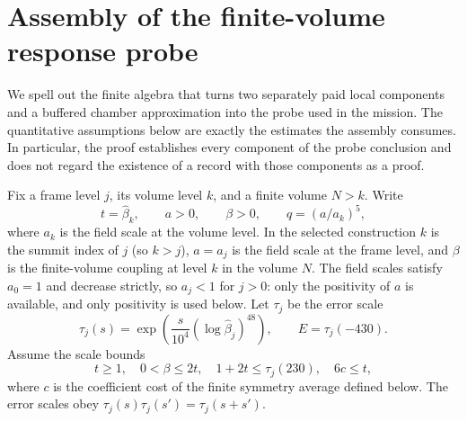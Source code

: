 \section{Assembly of the finite-volume response probe}
\label{sec:ex-lattice-trace-probe-assembly}

We spell out the finite algebra that turns two separately paid local
components and a buffered chamber approximation into the probe used in the
mission. The quantitative assumptions below are exactly the estimates the
assembly consumes. In particular, the proof establishes every component of
the probe conclusion and does not regard the existence of a record with
those components as a proof.

Fix a frame level $j$, its volume level $k$, and a finite volume $N>k$.
Write
\[
 t=\widehat\beta_k,\qquad a>0,\qquad \beta>0,\qquad
 q=(a/a_k)^5,
\]
where $a_k$ is the field scale at the volume level. In the selected
construction $k$ is the summit index of $j$ (so $k>j$), $a=a_j$ is the
field scale at the frame level, and $\beta$ is the finite-volume coupling
at level $k$ in the volume $N$. The field scales satisfy $a_0=1$ and
decrease strictly, so $a_j<1$ for $j>0$: only the positivity of $a$ is
available, and only positivity is used below. Let $\tau_j$ be the
error scale
\[
 \tau_j(s)=\exp\!\left(\frac{s}{10^4}
           (\log\widehat\beta_j)^{48}\right),
 \qquad E=\tau_j(-430).
\]
Assume the scale bounds
\begin{equation}
 t\geq1,\quad 0<\beta\leq2t,\quad
 1+2t\leq\tau_j(230),\quad 6c\leq t,
 \label{eq:ex-trace-probe-scales}
\end{equation}
where $c$ is the coefficient cost of the finite symmetry average defined
below. The error scales obey $\tau_j(s)\tau_j(s')=\tau_j(s+s')$.

